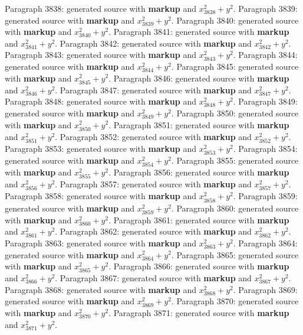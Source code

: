 \documentclass{article}
\begin{document}
Paragraph 3838: generated source with \textbf{markup} and $x_{3838}^2 + y^2$.
Paragraph 3839: generated source with \textbf{markup} and $x_{3839}^2 + y^2$.
Paragraph 3840: generated source with \textbf{markup} and $x_{3840}^2 + y^2$.
Paragraph 3841: generated source with \textbf{markup} and $x_{3841}^2 + y^2$.
Paragraph 3842: generated source with \textbf{markup} and $x_{3842}^2 + y^2$.
Paragraph 3843: generated source with \textbf{markup} and $x_{3843}^2 + y^2$.
Paragraph 3844: generated source with \textbf{markup} and $x_{3844}^2 + y^2$.
Paragraph 3845: generated source with \textbf{markup} and $x_{3845}^2 + y^2$.
Paragraph 3846: generated source with \textbf{markup} and $x_{3846}^2 + y^2$.
Paragraph 3847: generated source with \textbf{markup} and $x_{3847}^2 + y^2$.
Paragraph 3848: generated source with \textbf{markup} and $x_{3848}^2 + y^2$.
Paragraph 3849: generated source with \textbf{markup} and $x_{3849}^2 + y^2$.
Paragraph 3850: generated source with \textbf{markup} and $x_{3850}^2 + y^2$.
Paragraph 3851: generated source with \textbf{markup} and $x_{3851}^2 + y^2$.
Paragraph 3852: generated source with \textbf{markup} and $x_{3852}^2 + y^2$.
Paragraph 3853: generated source with \textbf{markup} and $x_{3853}^2 + y^2$.
Paragraph 3854: generated source with \textbf{markup} and $x_{3854}^2 + y^2$.
Paragraph 3855: generated source with \textbf{markup} and $x_{3855}^2 + y^2$.
Paragraph 3856: generated source with \textbf{markup} and $x_{3856}^2 + y^2$.
Paragraph 3857: generated source with \textbf{markup} and $x_{3857}^2 + y^2$.
Paragraph 3858: generated source with \textbf{markup} and $x_{3858}^2 + y^2$.
Paragraph 3859: generated source with \textbf{markup} and $x_{3859}^2 + y^2$.
Paragraph 3860: generated source with \textbf{markup} and $x_{3860}^2 + y^2$.
Paragraph 3861: generated source with \textbf{markup} and $x_{3861}^2 + y^2$.
Paragraph 3862: generated source with \textbf{markup} and $x_{3862}^2 + y^2$.
Paragraph 3863: generated source with \textbf{markup} and $x_{3863}^2 + y^2$.
Paragraph 3864: generated source with \textbf{markup} and $x_{3864}^2 + y^2$.
Paragraph 3865: generated source with \textbf{markup} and $x_{3865}^2 + y^2$.
Paragraph 3866: generated source with \textbf{markup} and $x_{3866}^2 + y^2$.
Paragraph 3867: generated source with \textbf{markup} and $x_{3867}^2 + y^2$.
Paragraph 3868: generated source with \textbf{markup} and $x_{3868}^2 + y^2$.
Paragraph 3869: generated source with \textbf{markup} and $x_{3869}^2 + y^2$.
Paragraph 3870: generated source with \textbf{markup} and $x_{3870}^2 + y^2$.
Paragraph 3871: generated source with \textbf{markup} and $x_{3871}^2 + y^2$.
\end{document}
